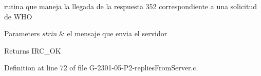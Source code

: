 rutina que maneja la llegada de la respuesta 352 correspondiente a una solicitud de W\-H\-O 


\begin{DoxyParams}{Parameters}
{\em strin} & el mensaje que envia el servidor\\
\hline
\end{DoxyParams}
\begin{DoxyReturn}{Returns}
I\-R\-C\-\_\-\-O\-K 
\end{DoxyReturn}


Definition at line 72 of file G-\/2301-\/05-\/\-P2-\/replies\-From\-Server.\-c.

